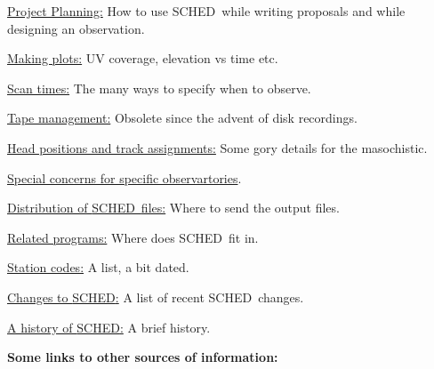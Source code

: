 \documentclass{report}
\newcommand{\sched}{{\sc SCHED}}
\newcommand{\schedb}{{\sc SCHED~}}
\begin{document}
\begin{list}{}{\parsep 0em  \itemsep 0em }

\item 
{\hyperref[SEC:PLANNING]{Project Planning:}} How to use \schedb while
writing proposals and while designing an observation.

\item 
{\hyperref[SEC:PLOT]{Making plots:}} UV coverage, elevation vs time etc.

\item 
{\hyperref[SSEC:SCANTIMES]{Scan times:}}  The many ways to specify when
to observe.

\item 
{\hyperref[SSEC:TAPEMANAGEMENT]{Tape management:}}  Obsolete since the
advent of disk recordings.

\item 
{\hyperref[APP:HEAD]{Head positions and track assignments:}} Some gory
details for the masochistic.

\item 
{\hyperref[SEC:INDIV]{Special concerns for specific observartories}}.

\item 
{\hyperref[SEC:DISFIL]{Distribution of \schedb files:}}  Where to send the output files.

\item 
{\hyperref[SEC:RELATEDPROGRAMS]{Related programs:}} Where does \schedb fit
in.

\item 
{\hyperref[APP:STACODES]{Station codes:}} A list, a bit dated.

\item 
{\hyperref[CHP:CHANG]{Changes to \sched:}} A list of recent \schedb changes.

\item 
{\hyperref[SEC:HIST]{A history of \sched:}} A brief history.

\end{list}


{\bf Some links to other sources of information:}
\end{document}
